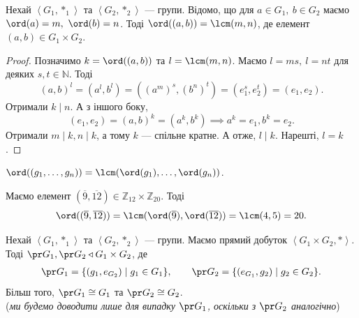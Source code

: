 \documentclass{math_library}
\begin{document}

\begin{proposition}
Нехай $\left<G_1, *_1 \right>$ та $\left<G_2, *_2 \right>$ --- групи. Відомо, що для $a \in G_1,\ b \in G_2$ маємо $\ord(a) = m,\ \ord(b) = n$. Тоді $\ord((a,b)) = \lcm(m,n)$, де елемент $(a,b) \in G_1 \times G_2$.
\end{proposition}

\begin{proof}
Позначимо $k = \ord((a,b))$ та $l = \lcm(m,n)$. Маємо $l = ms,\ l = nt$ для деяких $s,t \in \mathbb{N}$. Тоді
\[
(a,b)^l = (a^l,b^l) = ((a^m)^s, (b^n)^t) = (e_1^s, e_2^t) = (e_1,e_2).\] 
Отримали $k \mid n$. А з іншого боку, 
\[(e_1,e_2) = (a,b)^k = (a^k,b^k) \implies a^k = e_1, b^k = e_2.
\]
Отримали $m \mid k, n \mid k$, а тому $k$ --- спільне кратне. А отже, $l \mid k$. Нарешті, $l = k$.
\end{proof}

\begin{corollary}
$\ord((g_1,\dots,g_n)) = \lcm(\ord(g_1), \dots, \ord(g_n))$.
\end{corollary}

\begin{example}
Маємо елемент $(\overline{9},\overline{12}) \in \mathbb{Z}_{12} \times \mathbb{Z}_{20}$. Тоді \[
\ord((\overline{9},\overline{12})) = \lcm(\ord(\overline{9}),\ord(\overline{12})) = \lcm(4,5) = 20.
\]
\end{example}

\begin{theorem}
Нехай $\left< G_1, *_1 \right>$ та $\left< G_2, *_2 \right>$ --- групи. Маємо прямий добуток $\left< G_1 \times G_2, * \right>$. Тоді $\pr G_1, \pr G_2 \triangleleft G_1 \times G_2$, де
\begin{align*}
\pr G_1 = \{ (g_1, e_{G_2}) \mid g_1 \in G_1 \}, \qquad \pr G_2 = \{ (e_{G_1}, g_2) \mid g_2 \in G_2 \}.
\end{align*}
Більш того, $\pr G_1 \cong G_1$ та $\pr G_2 \cong G_2$.\\
(\textit{ми будемо доводити лише для випадку $\pr G_1$, оскільки з $\pr G_2$ аналогічно})
\end{theorem}
\end{document}
